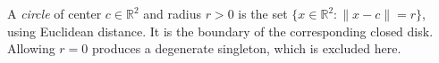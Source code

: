 
A \emph{circle} of center $c\in\mathbb R^2$ and radius $r>0$ is the set $\{x\in\mathbb R^2:\|x-c\|=r\}$, using Euclidean distance. It is the boundary of the corresponding closed disk. Allowing $r=0$ produces a degenerate singleton, which is excluded here.
